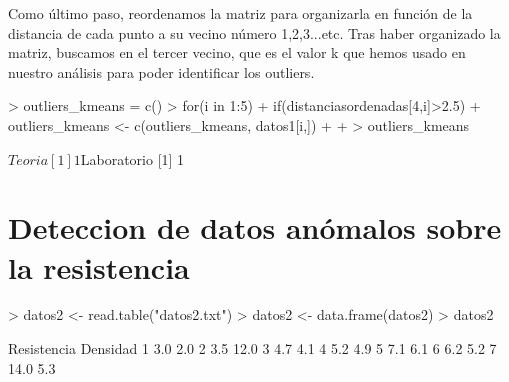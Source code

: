 \documentclass [a4paper] {article}
\begin{document}
Como último paso, reordenamos la matriz para organizarla en función de la distancia
de cada punto a su vecino número 1,2,3...etc. Tras haber organizado la matriz, buscamos en el tercer
vecino, que es el valor k que hemos usado en nuestro análisis para poder identificar los outliers.
\begin{Schunk}
\begin{Sinput}
> outliers_kmeans = c()
> for(i in 1:5){
+   if(distanciasordenadas[4,i]>2.5){
+     outliers_kmeans <- c(outliers_kmeans, datos1[i,])
+   }
+ }
> outliers_kmeans
\end{Sinput}
\begin{Soutput}
$Teoria
[1] 1

$Laboratorio
[1] 1
\end{Soutput}
\end{Schunk}



\section{Deteccion de datos anómalos sobre la resistencia }

\begin{Schunk}
\begin{Sinput}
> datos2 <- read.table("datos2.txt")
> datos2 <- data.frame(datos2)
> datos2
\end{Sinput}
\begin{Soutput}
  Resistencia Densidad
1         3.0      2.0
2         3.5     12.0
3         4.7      4.1
4         5.2      4.9
5         7.1      6.1
6         6.2      5.2
7        14.0      5.3
\end{Soutput}
\end{Schunk}
\end{document}
